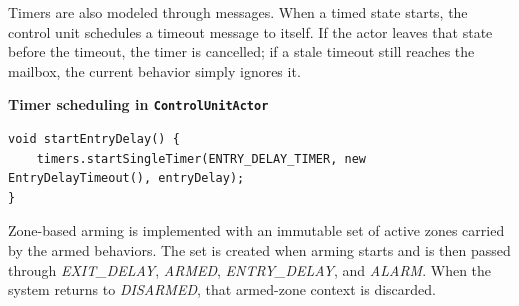 Timers are also modeled through messages.
When a timed state starts, the control unit schedules a timeout message to itself.
If the actor leaves that state before the timeout, the timer is cancelled; if a stale timeout still reaches the mailbox,
the current behavior simply ignores it.

\medskip

\noindent\textbf{Timer scheduling in \texttt{ControlUnitActor}}
\begin{lstlisting}[style=reportcode]
void startEntryDelay() {
    timers.startSingleTimer(ENTRY_DELAY_TIMER, new EntryDelayTimeout(), entryDelay);
}
\end{lstlisting}

Zone-based arming is implemented with an immutable set of active zones carried by the armed behaviors.
The set is created when arming starts and is then passed through \textit{EXIT\_DELAY}, \textit{ARMED},
\textit{ENTRY\_DELAY}, and \textit{ALARM}.
When the system returns to \textit{DISARMED}, that armed-zone context is discarded.
